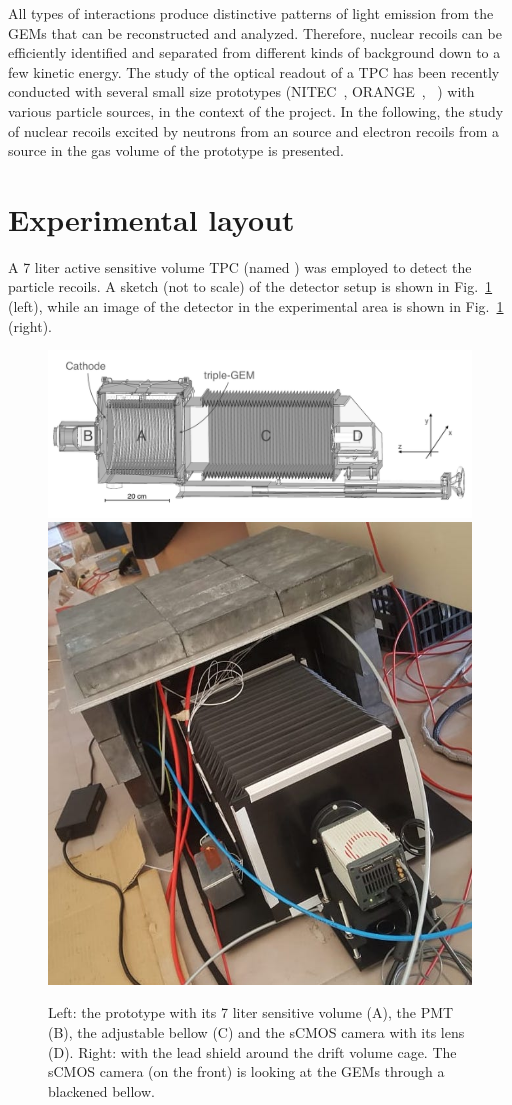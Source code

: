 \documentclass[12pt]{iopart}
\begin{document}
All types of interactions produce distinctive patterns of light
emission from the GEMs that can be reconstructed and
analyzed. Therefore, nuclear recoils can be efficiently identified and
separated from different kinds of background down to a few \keV
kinetic energy.  The study of the optical readout of a TPC has been
recently conducted with several small size prototypes
(NITEC~\cite{JINST:nitec}, ORANGE~\cite{NIM:Marafinietal,
  bib:jinst_orange2}, \lemon~\cite{bib:eps, bib:ieee17, bib:elba})
with various particle sources, in the context of the \cygno
project. In the following, the study of nuclear recoils excited by
neutrons from an \ambe source and electron recoils from a \fe source
in the gas volume of the \lemon prototype is presented.



\section{Experimental layout  }
\label{sec:layout}
A 7 liter active sensitive volume TPC (named \lemon) was employed to
detect the particle recoils. A sketch (not to scale) of the detector
setup is shown in Fig.~\ref{fig:lemon} (left), while an image of the
detector in the experimental area is shown in Fig.~\ref{fig:lemon}
(right).
% 
\begin{figure}[ht]
	\centering
	\includegraphics[width=0.70\linewidth]{figures/lemon.png}
        \includegraphics[width=0.20\linewidth]{LEMON-Shielded.jpg}
  	\caption{Left: the \lemon prototype with  its 7 liter sensitive
          volume (A), the PMT (B), the adjustable bellow (C) and the
          sCMOS camera with its lens (D). Right: \lemon
          with the lead shield around the drift volume cage. The sCMOS
          camera (on the front) is looking at the GEMs through a
          blackened bellow.
  	\label{fig:lemon}}
\end{figure}
\end{document}
